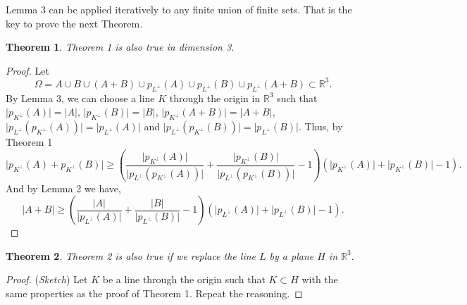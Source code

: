 \documentclass[12pt]{article}
\newcommand{\R}{\mathbb{R}}
\newtheorem{theorem}{Theorem}
\begin{document}
Lemma 3 can be applied iteratively to any finite union of finite sets. That is the key to prove the next Theorem.

\begin{theorem}
    Theorem 1 is also true in dimension 3.
\end{theorem}
\begin{proof}
    Let 
    $$\Omega = A \cup B \cup (A + B) \cup p_{L^\perp}(A) \cup p_{L^\perp}(B) \cup p_{L^\perp}(A+B) \subset \R^3.$$
    By Lemma 3, we can choose a line $K$ through the origin in $\R^3$ such that
    $\lvert p_{K^\perp}(A) \rvert = \lvert A \rvert$, $\lvert p_{K^\perp}(B) \rvert = \lvert B \rvert$, $\lvert p_{K^\perp}(A + B) \rvert = \lvert A + B\rvert$, $\lvert p_{L^\perp}(p_{K^\perp}(A)) \rvert = \lvert p_{L^\perp}(A) \rvert$ and $\lvert p_{L^\perp}(p_{K^\perp}(B)) \rvert = \lvert p_{L^\perp}(B) \rvert$. Thus, by Theorem 1
    $$\lvert   p_{K^\perp}(A) +  p_{K^\perp}(B) \rvert \geq \left( \frac{\lvert  p_{K^\perp}(A) \rvert }{\lvert  p_{L^\perp}(p_{K^\perp}(A))  \rvert} + \frac{\lvert  p_{K^\perp}(B) \rvert }{\lvert  p_{L^\perp}(p_{K^\perp}(B))  \rvert } - 1\right) \left( \lvert p_{K^\perp}(A) \rvert + \lvert p_{K^\perp}(B) \rvert - 1 \right).$$ And by Lemma 2 we have,
     $$\lvert A + B \rvert \geq \left( \frac{\lvert A \rvert }{\lvert p_{L^\perp}(A) \rvert} + \frac{\lvert B \rvert }{\lvert p_{L^\perp} (B) \rvert } - 1\right) \left( \lvert p_{L^\perp}(A) \rvert + \lvert p_{L^\perp}(B) \rvert - 1 \right).$$
\end{proof}


\begin{theorem}
    Theorem 2 is also true if we replace the line $L$ by a plane $H$ in $\R^3.$
\end{theorem}
\begin{proof} (\textit{Sketch})
    Let $K$ be a line through the origin such that $K \subset H$ with the same properties as the proof of Theorem 1. Repeat the reasoning.  
\end{proof}


\end{document}
